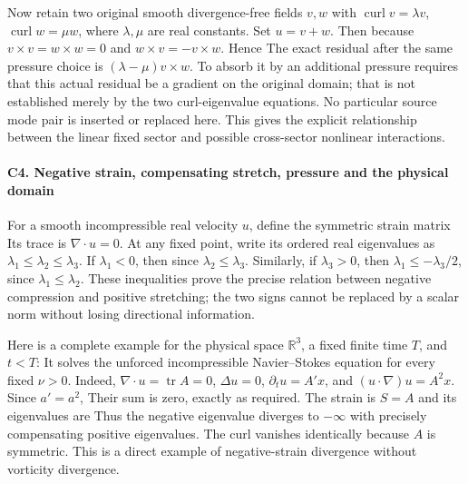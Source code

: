 Now retain two original smooth divergence-free fields \(v,w\) with
\(\operatorname{curl}v=\lambda v\), \(\operatorname{curl}w=\mu w\),
where \(\lambda,\mu\) are real constants. Set \(u=v+w\). Then
 because \(v\times v=w\times w=0\) and \(w\times v=-v\times w\). Hence
 The exact residual after the same pressure choice is
\((\lambda-\mu)v\times w\). To absorb it by an additional pressure
requires that this actual residual be a gradient on the original domain;
that is not established merely by the two curl-eigenvalue equations. No
particular source mode pair is inserted or replaced here. This gives the
explicit relationship between the linear fixed sector and possible
cross-sector nonlinear interactions.

\paragraph{C4. Negative strain, compensating stretch, pressure and the
physical
domain}\label{TranscriptLedgerStage:c4.-negative-strain-compensating-stretch-pressure-and-the-physical-domain}

For a smooth incompressible real velocity \(u\), define the symmetric
strain matrix  Its trace is \(\nabla\cdot u=0\). At any fixed point, write its
ordered real eigenvalues as \(\lambda_1\le\lambda_2\le\lambda_3\). If
\(\lambda_1<0\), then  since \(\lambda_2\le\lambda_3\). Similarly, if \(\lambda_3>0\), then
\(\lambda_1\le-\lambda_3/2\), since \(\lambda_1\le\lambda_2\). These
inequalities prove the precise relation between negative compression and
positive stretching; the two signs cannot be replaced by a scalar norm
without losing directional information.

Here is a complete example for the physical space \(\mathbb R^3\), a
fixed finite time \(T\), and \(t<T\):   It solves the unforced incompressible Navier--Stokes equation for
every fixed \(\nu>0\). Indeed, \(\nabla\cdot u=\operatorname{tr}A=0\),
\(\Delta u=0\), \(\partial_tu=A'x\), and \((u\cdot\nabla)u=A^2x\). Since
\(a'=a^2\),  Their sum is zero, exactly as required. The strain is \(S=A\) and its
eigenvalues are  Thus the negative eigenvalue diverges to \(-\infty\) with precisely
compensating positive eigenvalues. The curl vanishes identically because
\(A\) is symmetric. This is a direct example of negative-strain
divergence without vorticity divergence.

